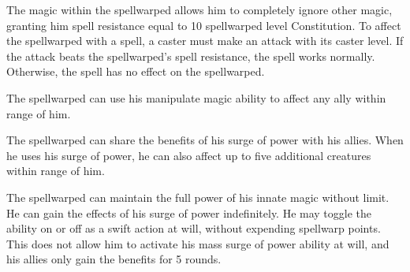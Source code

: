 The magic within the spellwarped allows him to completely ignore other magic, granting him spell resistance equal to 10 \add spellwarped level \add Constitution.
To affect the spellwarped with a spell, a caster must make an attack with its caster level.
If the attack beats the spellwarped's spell resistance, the spell works normally.
Otherwise, the spell has no effect on the spellwarped.

The spellwarped can use his manipulate magic ability to affect any ally within \rngmed range of him.

The spellwarped can share the benefits of his surge of power with his allies.
When he uses his surge of power, he can also affect up to five additional creatures within \rngmed range of him.

The spellwarped can maintain the full power of his innate magic without limit.
He can gain the effects of his surge of power indefinitely.
He may toggle the ability on or off as a swift action at will, without expending spellwarp points.
This does not allow him to activate his mass surge of power ability at will, and his allies only gain the benefits for 5 rounds.

\label{Spellwarped Powers}

